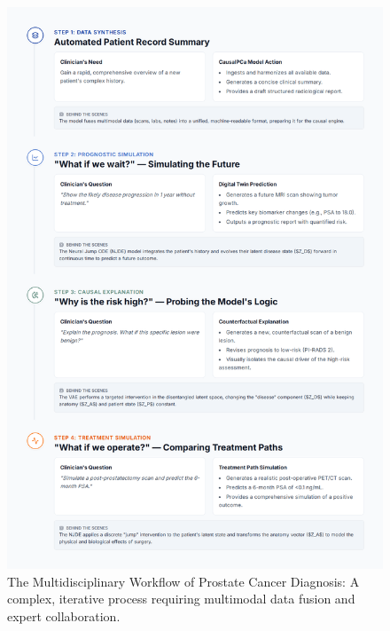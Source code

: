 \documentclass[11pt, a4paper]{article}
\begin{document}
\begin{figure}[H]
    \centering
    \includegraphics[width=\textwidth]{wf.png}
    \caption{The Multidisciplinary Workflow of Prostate Cancer Diagnosis: A complex, iterative process requiring multimodal data fusion and expert collaboration.}
    \label{fig:workflow}
\end{figure}
\end{document}
